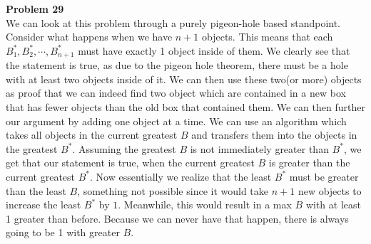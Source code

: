\documentclass[12pt]{article}
\begin{document}
\noindent
\textbf{Problem 29}\\
We can look at this problem through a purely pigeon-hole based standpoint. Consider what happens when we have $n+1$ objects.
This means that each $B^*_1, B^*_2, \cdots, B^*_{n+1}$ must have exactly 1 object inside of them. We clearly see that the statement is true,
as due to the pigeon hole theorem, there must be a hole with at least two objects inside of it. We can then use these two(or more) objects
as proof that we can indeed find two object which are contained in a new box that has fewer objects than the old box that contained them. 
We can then further our argument by adding one object at a time. We can use an algorithm
which takes all objects in the current greatest $B$ and transfers them into the objects in the greatest $B^*$.
Assuming the greatest $B$ is not immediately greater than $B^*$, we get that our
statement is true, when the current greatest $B$ is greater than the current
greatest $B^*$. Now essentially we realize that the least $B^*$ must be greater than the least $B$, something not possible since
it would take $n+1$ new objects to increase the least $B^*$ by $1$. Meanwhile, this would result in a max $B$ with at least 1 greater than before.
Because we can never have that happen, there is always going to be 1 with greater $B$.
\end{document}
